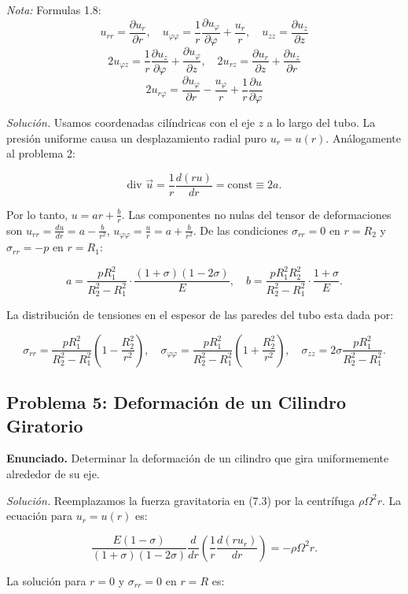 \documentclass{article}
\begin{document}
\textit{Nota:} Formulas 1.8: $$ u_{rr} = \frac{\partial u_r}{\partial r}, \quad u_{\varphi \varphi}=\frac{1}{r}\frac{\partial u_\varphi}{\partial \varphi} + \frac{u_r}{r}, \quad u_{zz} = \frac{\partial u_z}{\partial z} $$
$$ 2u_{\varphi z}=\frac{1}{r}\frac{\partial u_z}{\partial \varphi}+\frac{\partial u_\varphi}{\partial z}, \quad 2u_{rz}=\frac{\partial u_r}{\partial z} + \frac{\partial u_z}{\partial r}$$
$$ 2u_{r \varphi}= \frac{\partial u_\varphi}{\partial r}-\frac{u_\varphi}{r}+\frac{1}{r}\frac{\partial u}{\partial \varphi} $$

\textit{Solución.} Usamos coordenadas cilíndricas con el eje $z$ a lo largo del tubo. La presión uniforme causa un desplazamiento radial puro $u_r = u(r)$. Análogamente al problema 2:

$$
\text{div } \vec{u} = \frac{1}{r} \frac{d(ru)}{dr} = \text{const} \equiv 2a.
$$

Por lo tanto, $u = ar + \frac{b}{r}$. Las componentes no nulas del tensor de deformaciones son $u_{rr} = \frac{du}{dr} = a - \frac{b}{r^2}$, $u_{\varphi\varphi} = \frac{u}{r} = a + \frac{b}{r^2}$. De las condiciones $\sigma_{rr} = 0$ en $r = R_2$ y $\sigma_{rr} = -p$ en $r = R_1$:

$$
a = \frac{pR_1^2}{R_2^2 - R_1^2} \cdot \frac{(1+\sigma)(1-2\sigma)}{E}, \quad b = \frac{pR_1^2 R_2^2}{R_2^2 - R_1^2} \cdot \frac{1+\sigma}{E}.
$$

La distribución de tensiones en el espesor de las paredes del tubo esta dada por:

$$
\sigma_{rr} = \frac{pR_1^2}{R_2^2 - R_1^2} \left(1 - \frac{R_2^2}{r^2}\right), \quad \sigma_{\varphi\varphi} = \frac{pR_1^2}{R_2^2 - R_1^2} \left(1 + \frac{R_2^2}{r^2}\right), \quad \sigma_{zz} = 2\sigma \frac{pR_1^2}{R_2^2 - R_1^2}.
$$

\subsection*{Problema 5: Deformación de un Cilindro Giratorio}
\textbf{Enunciado.} Determinar la deformación de un cilindro que gira uniformemente alrededor de su eje.

\textit{Solución.} Reemplazamos la fuerza gravitatoria en (7.3) por la centrífuga $\rho \Omega^2 r$. La ecuación para $u_r = u(r)$ es:

$$
\frac{E(1-\sigma)}{(1+\sigma)(1-2\sigma)} \frac{d}{dr} \left( \frac{1}{r} \frac{d(ru_r)}{dr} \right) = -\rho \Omega^2 r.
$$

La solución para $r = 0$ y $\sigma_{rr} = 0$ en $r = R$ es:
\end{document}
